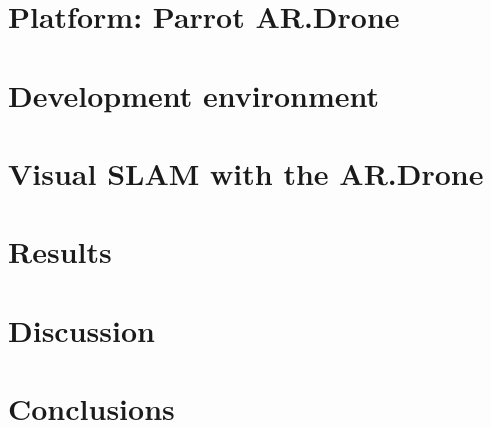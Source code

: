 \documentclass[twoside]{uva-bachelor-thesis}
\begin{document}
\chapter{Platform: Parrot AR.Drone}
\label{chapter:platform}




\chapter{Development environment}
\label{chapter:development-environment}




\chapter{Visual SLAM with the AR.Drone}
\label{chapter:visual-slam}




\chapter{Results}
\label{chapter:results}




\chapter{Discussion}
\label{chapter:discussion}




\chapter{Conclusions}
\label{chapter:conclusions}




\appendix


\linespread{1.0}


\end{document}
